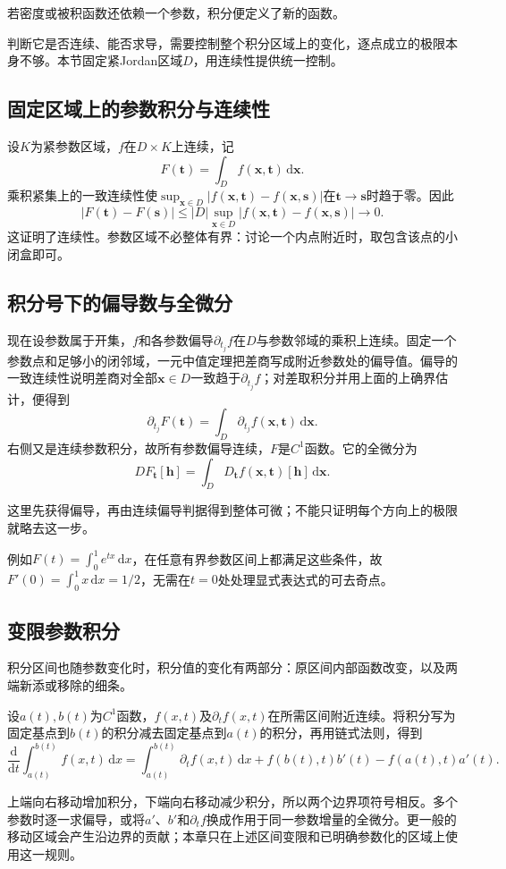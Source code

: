 若密度或被积函数还依赖一个参数，积分便定义了新的函数。

判断它是否连续、能否求导，需要控制整个积分区域上的变化，逐点成立的极限本身不够。本节固定紧Jordan区域$D$，用连续性提供统一控制。

\subsection{固定区域上的参数积分与连续性}

设$K$为紧参数区域，$f$在$D\times K$上连续，记
\[
 F(\bm t)=\int_D f(\bm x,\bm t)\,\mathrm d\bm x.
\]
乘积紧集上的一致连续性使$\sup_{\bm x\in D}|f(\bm x,\bm t)-f(\bm x,\bm s)|$在$\bm t\to\bm s$时趋于零。因此
\[
 |F(\bm t)-F(\bm s)|
 \leq |D|\sup_{\bm x\in D}|f(\bm x,\bm t)-f(\bm x,\bm s)|\longrightarrow0.
\]
这证明了连续性。参数区域不必整体有界：讨论一个内点附近时，取包含该点的小闭盒即可。

\subsection{积分号下的偏导数与全微分}

现在设参数属于开集，$f$和各参数偏导$\partial_{t_j}f$在$D$与参数邻域的乘积上连续。固定一个参数点和足够小的闭邻域，一元中值定理把差商写成附近参数处的偏导值。偏导的一致连续性说明差商对全部$\bm x\in D$一致趋于$\partial_{t_j}f$；对差取积分并用上面的上确界估计，便得到
\begin{equation}
 \partial_{t_j}F(\bm t)=\int_D\partial_{t_j}f(\bm x,\bm t)\,\mathrm d\bm x.
\label{eq:classical-differentiate-under-integral}
\end{equation}
右侧又是连续参数积分，故所有参数偏导连续，$F$是$C^1$函数。它的全微分为
\[
 DF_{\bm t}[\bm h]=\int_D D_{\bm t}f(\bm x,\bm t)[\bm h]\,\mathrm d\bm x.
\]

这里先获得偏导，再由连续偏导判据得到整体可微；不能只证明每个方向上的极限就略去这一步。

例如$F(t)=\int_0^1 e^{tx}\,\mathrm dx$，在任意有界参数区间上都满足这些条件，故$F'(0)=\int_0^1x\,\mathrm dx=1/2$，无需在$t=0$处处理显式表达式的可去奇点。

\subsection{变限参数积分}

积分区间也随参数变化时，积分值的变化有两部分：原区间内部函数改变，以及两端新添或移除的细条。

设$a(t),b(t)$为$C^1$函数，$f(x,t)$及$\partial_tf(x,t)$在所需区间附近连续。将积分写为固定基点到$b(t)$的积分减去固定基点到$a(t)$的积分，再用链式法则，得到
\[
 \frac{\mathrm d}{\mathrm dt}\int_{a(t)}^{b(t)}f(x,t)\,\mathrm dx
 =\int_{a(t)}^{b(t)}\partial_tf(x,t)\,\mathrm dx
 +f(b(t),t)b'(t)-f(a(t),t)a'(t).
\]

上端向右移动增加积分，下端向右移动减少积分，所以两个边界项符号相反。多个参数时逐一求偏导，或将$a'$、$b'$和$\partial_tf$换成作用于同一参数增量的全微分。更一般的移动区域会产生沿边界的贡献；本章只在上述区间变限和已明确参数化的区域上使用这一规则。
